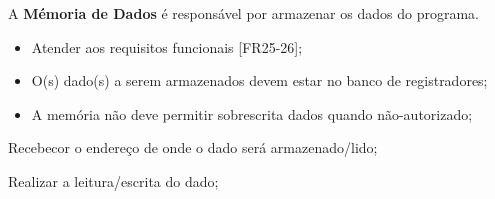 A \textbf{Mémoria de Dados} é responsável por armazenar os dados do programa.
  
\actors
	\begin{description}
	\end{description}
  
\preconditions 
	\begin{itemize}
	\item Atender aos requisitos funcionais [FR25-26];
	\item O(s) dado(s) a serem armazenados devem estar no banco de registradores;
	\end{itemize}

\postconditions
    \begin{itemize}
     \item A memória não deve permitir sobrescrita dados quando não-autorizado;
     \end{itemize}
  
\begin{mainflow}
\item Recebecor o endereço de onde o dado será armazenado/lido;
\item Realizar a leitura/escrita do dado;
\end{mainflow}
  
